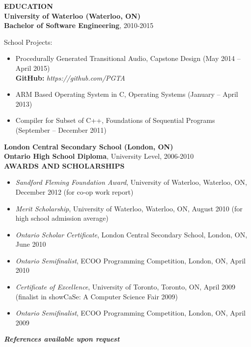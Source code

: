 \documentclass[10pt,letterpaper]{article}
\newenvironment{indentedlist}[1]%
{
\begin{list}{}%
    {\setlength{\leftmargin}{#1}}%
    \item[]%
}
{\end{list}
}
\newcommand{\education}[4]
{
    \textbf{#1 (#2)}\\
    \textbf{#3}, #4
}
\begin{document}
\vspace{1em}
\textbf{EDUCATION} \hrulefill \\[0.5em]
\education{University of Waterloo}{Waterloo, ON}{Bachelor of Software Engineering}{2010-2015}
\begin{indentedlist}{2em}
		\textbf{School Projects:}
		\begin{itemize}
            \item Procedurally Generated Transitional Audio, Capstone Design (May 2014 -- April 2015) \\
            \textbf{GitHub: }\emph{https://github.com/PGTA}
			\item ARM Based Operating System in C, Operating Systems (January -- April 2013)
			\item Compiler for Subset of C++, Foundations of Sequential Programs (September -- December 2011)
		\end{itemize}
\end{indentedlist}
\education{London Central Secondary School}{London, ON}{Ontario High School Diploma}{University Level, 2006-2010}\\[1em]
\textbf{AWARDS AND SCHOLARSHIPS} \hrulefill \\
\begin{adjustwidth}{0.1in}{0.5in}
    \begin{itemize}
	\item \emph{Sandford Fleming Foundation Award}, University of Waterloo, Waterloo, ON, December 2012
	    (for co-op work report)
	\item \emph{Merit Scholarship}, University of Waterloo, Waterloo, ON, August 2010
	    (for high school admission average)
	\item \emph{Ontario Scholar Certificate}, London Central Secondary School, London, ON, June 2010
	\item \emph{Ontario Semifinalist}, ECOO Programming Competition, London, ON, April 2010
	\item \emph{Certificate of Excellence}, University of Toronto, Toronto, ON, April 2009
	    (finalist in showCaSe: A Computer Science Fair 2009)
	\item \emph{Ontario Semifinalist}, ECOO Programming Competition, London, ON, April 2009
    \end{itemize}
\end{adjustwidth}
\vspace{1em}
\begin{center}
	\textbf{\textit{References available upon request}}
\end{center}
\end{document}
